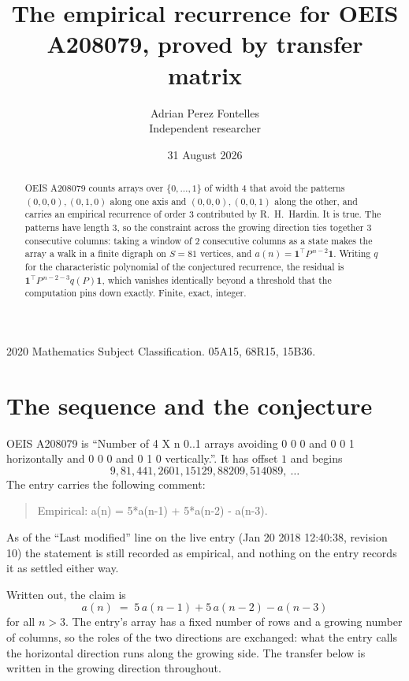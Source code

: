 \documentclass[11pt,a4paper]{article}
\title{The empirical recurrence for OEIS A208079, proved by transfer matrix}
\author{Adrian Perez Fontelles\\ \small Independent researcher}
\date{31 August 2026}
\theoremstyle{plain}
\theoremstyle{definition}
\begin{document}
\maketitle

\begin{abstract}
OEIS A208079 counts arrays over $\{0,\dots,1\}$ of width $4$ that avoid the patterns
$(0,0,0), (0,1,0)$ along one axis and $(0,0,0), (0,0,1)$ along the other, and carries an empirical recurrence of
order $3$ contributed by R.~H.~Hardin. It is true. The patterns have length $3$, so
the constraint across the growing direction ties together $3$ consecutive columns: taking a
window of $2$ consecutive columns as a state makes the array a walk in a finite digraph
on $S=81$ vertices, and $a(n)=\mathbf{1}^{\!\top}P^{\,n-2}\mathbf{1}$. Writing $q$
for the characteristic polynomial of the conjectured recurrence, the residual is
$\mathbf{1}^{\!\top}P^{\,n-2-3}q(P)\mathbf{1}$, which vanishes identically
beyond a threshold that the computation pins down exactly. Finite, exact, integer.
\end{abstract}

\noindent\small 2020 Mathematics Subject Classification. 05A15, 68R15, 15B36.\normalsize

\section{The sequence and the conjecture}

OEIS A208079 is ``Number of 4 X n 0..1 arrays avoiding 0 0 0 and 0 0 1 horizontally and 0 0 0 and 0 1 0 vertically.''. It has offset
$1$ and begins
\[
9, 81, 441, 2601, 15129, 88209, 514089,\ \dots
\]
The entry carries the following comment:
\begin{quote}\small
Empirical: a(n) = 5*a(n-1) + 5*a(n-2) - a(n-3).
\end{quote}
As of the ``Last modified'' line on the live entry (Jan 20 2018 12:40:38, revision
10) the statement is still recorded as empirical, and nothing on the entry
records it as settled either way.

Written out, the claim is
\begin{equation}\label{eq:conj}
a(n)\;=\;5\,a(n-1) + 5\,a(n-2) - a(n-3)
\end{equation}
for all $n>3$. The entry's array has a fixed number of rows and a growing number of
columns, so the roles of the two directions are exchanged: what the entry calls the
horizontal direction runs along the growing side. The transfer below is written in the
growing direction throughout.
\end{document}
